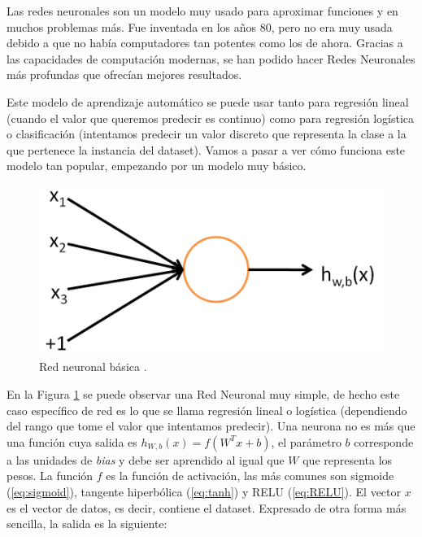 Las redes neuronales son un modelo muy usado para aproximar funciones y en muchos problemas más. Fue inventada en los años 80, pero no era muy usada debido a que no había computadores tan potentes como los de ahora. Gracias a las capacidades de computación modernas, se han podido hacer Redes Neuronales más profundas que ofrecían mejores resultados.\newline

Este modelo de aprendizaje automático se puede usar tanto para regresión lineal (cuando el valor que queremos predecir es continuo) como para regresión logística o clasificación (intentamos predecir un valor discreto que representa la clase a la que pertenece la instancia del dataset). Vamos a pasar a ver cómo funciona este modelo tan popular, empezando por un modelo muy básico.

\begin{figure}[H]
	\includegraphics[scale=0.25]{imagenes/03_Estado_del_arte/simplenn.png}
	\centering
	\caption{Red neuronal básica \cite{ng}.}
	\label{fig:simlestnn}
\end{figure}

En la Figura \ref{fig:simlestnn} se puede observar una Red Neuronal muy simple, de hecho este caso específico de red es lo que se llama regresión lineal o logística (dependiendo del rango que tome el valor que intentamos predecir). Una neurona no es más que una función cuya salida es $h_{W,b}(x)=f(W^Tx+b)$, el parámetro $b$ corresponde a las unidades de \textit{bias} y debe ser aprendido al igual que $W$ que representa los pesos. La función $f$ es la función de activación, las más comunes son sigmoide (\ref{eq:sigmoid}), tangente hiperbólica (\ref{eq:tanh}) y RELU (\ref{eq:RELU}). El vector $x$ es el vector de datos, es decir, contiene el dataset. Expresado de otra forma más sencilla, la salida es la siguiente:\newline


